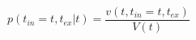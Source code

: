 \begin{equation}
p(t_{in}=t,t_{ex}|t)  = \frac{v(t,t_{in}=t,t_{ex})}{V(t)}
\end{equation}\begin{equation}

\end{equation}